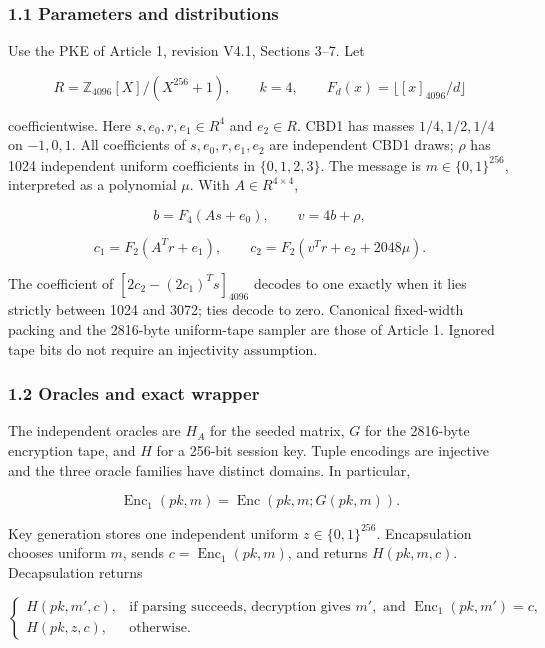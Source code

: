 \documentclass[11pt,a4paper]{article}
\begin{document}
\subsubsection{1.1 Parameters and distributions}\label{parameters-and-distributions}

Use the PKE of Article 1, revision V4.1, Sections 3--7. Let

\[
R=\mathbb Z_{4096}[X]/(X^{256}+1),\qquad k=4,
\qquad F_d(x)=\lfloor[x]_{4096}/d\rfloor
\]

coefficientwise. Here \(s,e_0,r,e_1\in R^4\) and \(e_2\in R\). CBD1 has masses \(1/4,1/2,1/4\) on \(-1,0,1\). All coefficients of \(s,e_0,r,e_1,e_2\) are independent CBD1 draws; \(\rho\) has 1024 independent uniform coefficients in \(\{0,1,2,3\}\). The message is \(m\in\{0,1\}^{256}\), interpreted as a polynomial \(\mu\). With \(A\in R^{4\times4}\),

\[
b=F_4(As+e_0),\qquad v=4b+\rho,
\]

\[
c_1=F_2(A^Tr+e_1),\qquad
c_2=F_2(v^Tr+e_2+2048\mu).
\]

The coefficient of \([2c_2-(2c_1)^Ts]_{4096}\) decodes to one exactly when it lies strictly between 1024 and 3072; ties decode to zero. Canonical fixed-width packing and the 2816-byte uniform-tape sampler are those of Article 1. Ignored tape bits do not require an injectivity assumption.

\subsubsection{1.2 Oracles and exact wrapper}\label{oracles-and-exact-wrapper}

The independent oracles are \(H_A\) for the seeded matrix, \(G\) for the 2816-byte encryption tape, and \(H\) for a 256-bit session key. Tuple encodings are injective and the three oracle families have distinct domains. In particular,

\[
\operatorname{Enc}_1(pk,m)=\operatorname{Enc}(pk,m;G(pk,m)).
\]

Key generation stores one independent uniform \(z\in\{0,1\}^{256}\). Encapsulation chooses uniform \(m\), sends \(c=\operatorname{Enc}_1(pk,m)\), and returns \(H(pk,m,c)\). Decapsulation returns

\[
\begin{cases}
H(pk,m',c),&\text{if parsing succeeds, decryption gives }m',
                  \text{ and }\operatorname{Enc}_1(pk,m')=c,\\
H(pk,z,c),&\text{otherwise}.
\end{cases}
\]
\end{document}
